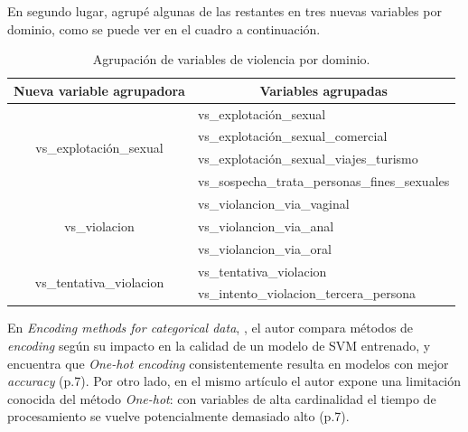 \documentclass[10 pt]{article}
\begin{document}
En segundo lugar, agrupé algunas de las restantes en tres nuevas variables por dominio, como se puede ver en el cuadro  a continuación.

\begin{table}[H]
    \centering
    \caption{Agrupación de variables de violencia por dominio.}
    \label{tablaagrup}
    \begin{tabular}{|c|l|}
    \hline
    \multicolumn{1}{|l|}{\textbf{Nueva variable agrupadora}} & \multicolumn{1}{c|}{\textbf{Variables agrupadas}} \\ \hline
    \multirow{4}{*}{vs\_explotación\_sexual}                 & vs\_explotación\_sexual                           \\ \cline{2-2} 
                                                             & vs\_explotación\_sexual\_comercial                \\ \cline{2-2} 
                                                             & vs\_explotación\_sexual\_viajes\_turismo          \\ \cline{2-2} 
                                                             & vs\_sospecha\_trata\_personas\_fines\_sexuales    \\ \hline
    \multirow{3}{*}{vs\_violacion}                          & vs\_violancion\_via\_vaginal                      \\ \cline{2-2} 
                                                             & vs\_violancion\_via\_anal                         \\ \cline{2-2} 
                                                             & vs\_violancion\_via\_oral                         \\ \hline
    \multirow{2}{*}{vs\_tentativa\_violacion}                & vs\_tentativa\_violacion                     \\ \cline{2-2} 
                                                             & vs\_intento\_violacion\_tercera\_persona           \\ \hline
    \end{tabular}
    \end{table}



En \textit{Encoding methods for categorical data}, \citep{udilua2023encoding}, el autor compara métodos de \textit{encoding} según su impacto en la calidad de un modelo de SVM entrenado, y encuentra que \textit{One-hot encoding} consistentemente resulta en modelos con mejor \textit{accuracy} (p.7). Por otro lado, en el mismo artículo el autor expone una limitación conocida del método \textit{One-hot}: con variables de alta cardinalidad el tiempo de procesamiento se vuelve potencialmente demasiado alto (p.7).
\end{document}

